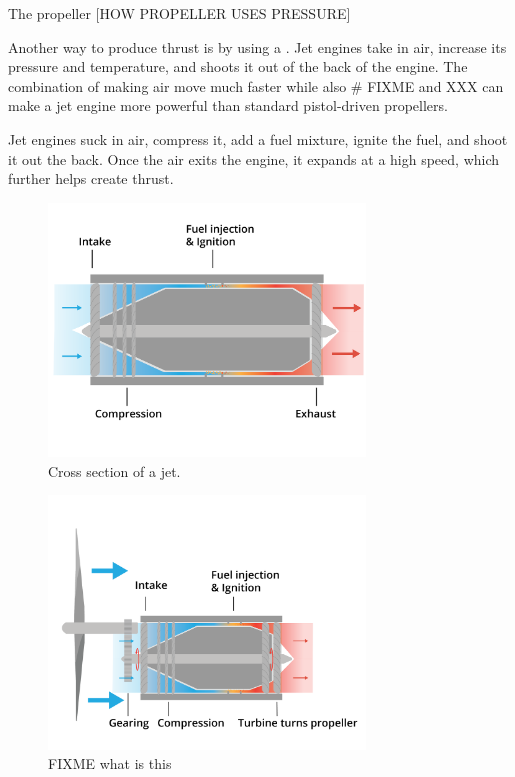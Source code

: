 
The propeller [HOW PROPELLER USES PRESSURE]

Another way to produce thrust is by using a . Jet engines take in air, increase its pressure and temperature, and shoots it out of the back of the engine. The combination of making air move much faster while also 
# FIXME
and XXX can make a jet engine more powerful than standard pistol-driven propellers. 


Jet engines suck in air, compress it, add a fuel mixture, ignite the fuel, and shoot it out the back. Once the air exits the engine, it expands at a high speed, which further helps create thrust. 




\begin{figure}[htbp]
    \centering
    \includegraphics[width=0.75\textwidth]{jet.png}
    \caption{Cross section of a jet.}
    \label{fig:jet}
\end{figure}
    

\begin{figure}[htbp]
    \centering
    \includegraphics[width=0.75\textwidth]{turboProp.png}
    \caption{FIXME what is this}
    \label{fig:turboProp}
\end{figure}


